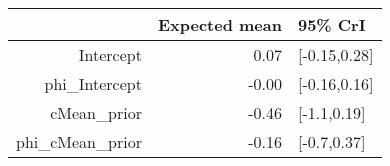 \begin{tabular}{rrl}
  \hline
 & Expected mean & 95\% CrI \\ 
  \hline
Intercept & 0.07 & [-0.15,0.28] \\ 
  phi\_Intercept & -0.00 & [-0.16,0.16] \\ 
  cMean\_prior & -0.46 & [-1.1,0.19] \\ 
  phi\_cMean\_prior & -0.16 & [-0.7,0.37] \\ 
   \hline
\end{tabular}

